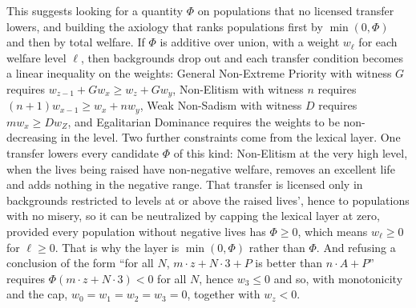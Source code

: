 \documentclass[
  11pt,
  letterpaper,
  DIV=11,
  numbers=noendperiod,
  twoside]{scrartcl}
\begin{document}
This suggests looking for a quantity \(\Phi\) on populations that no
licensed transfer lowers, and building the axiology that ranks
populations first by \(\min(0, \Phi)\) and then by total welfare. If
\(\Phi\) is additive over union, with a weight \(w_\ell\) for each
welfare level \(\ell\), then backgrounds drop out and each transfer
condition becomes a linear inequality on the weights: General
Non-Extreme Priority with witness \(G\) requires
\(w_{z-1} + G w_x \geq w_z + G w_y\), Non-Elitism with witness \(n\)
requires \((n+1) w_{x-1} \geq w_x + n w_y\), Weak Non-Sadism with
witness \(D\) requires \(m w_x \geq D w_Z\), and Egalitarian Dominance
requires the weights to be non-decreasing in the level. Two further
constraints come from the lexical layer. One transfer lowers every
candidate \(\Phi\) of this kind: Non-Elitism at the very high level,
when the lives being raised have non-negative welfare, removes an
excellent life and adds nothing in the negative range. That transfer is
licensed only in backgrounds restricted to levels at or above the raised
lives', hence to populations with no misery, so it can be neutralized by
capping the lexical layer at zero, provided every population without
negative lives has \(\Phi \geq 0\), which means \(w_\ell \geq 0\) for
\(\ell \geq 0\). That is why the layer is \(\min(0, \Phi)\) rather than
\(\Phi\). And refusing a conclusion of the form ``for all \(N\),
\(m \cdot z + N \cdot 3 + P\) is better than \(n \cdot A + P\)''
requires \(\Phi(m \cdot z + N \cdot 3) < 0\) for all \(N\), hence
\(w_3 \leq 0\) and so, with monotonicity and the cap,
\(w_0 = w_1 = w_2 = w_3 = 0\), together with \(w_z < 0\).
\end{document}
